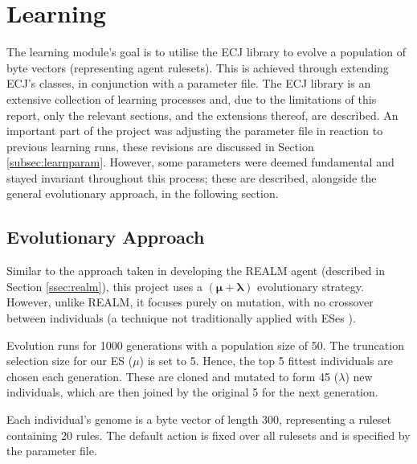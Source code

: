 
\section{Learning}

The learning module's goal is to utilise the ECJ library to evolve a population of byte vectors (representing agent rulesets). This is achieved through extending ECJ's classes, in conjunction with a parameter file. The ECJ library is an extensive collection of learning processes and, due to the limitations of this report, only the relevant sections, and the extensions thereof, are described. An important part of the project was adjusting the parameter file in reaction to previous learning runs, these revisions are discussed in Section \ref{subsec:learnparam}. However, some parameters were deemed fundamental and stayed invariant throughout this process; these are described, alongside the general evolutionary approach, in the following section.


\subsection{Evolutionary Approach}
\label{subsec:learndes}

Similar to the approach taken in developing the REALM agent (described in Section \ref{ssec:realm}), this project uses a $\pmb{(\mu  + \lambda)}$ evolutionary strategy. However, unlike REALM, it focuses purely on mutation, with no crossover between individuals (a technique not traditionally applied with ESes \cite[p.~]{ecj-tut3}).

Evolution runs for 1000 generations with a population size of 50. The truncation selection size for our ES ($\mu$) is set to 5. Hence, the top 5 fittest individuals are chosen each generation. These are cloned and mutated to form 45 ($\lambda$) new individuals, which are then joined by the original 5 for the next generation.

Each individual's genome is a byte vector of length 300, representing a ruleset containing 20 rules. The default action is fixed over all rulesets and is specified by the parameter file.

